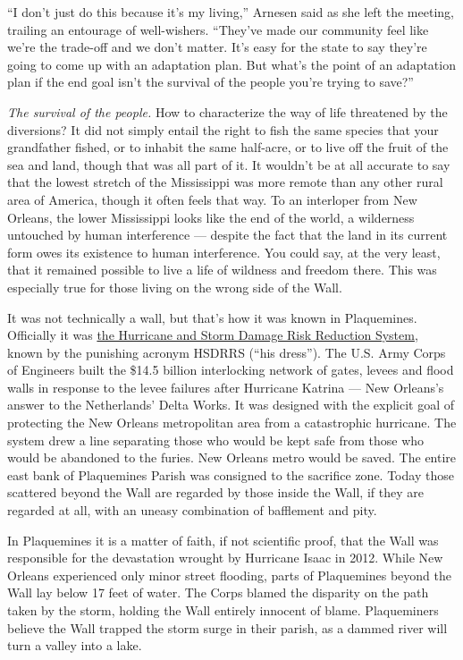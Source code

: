 ``I don't just do this because it's my living,'' Arnesen said as she
left the meeting, trailing an entourage of well-wishers. ``They've made
our community feel like we're the trade-off and we don't matter. It's
easy for the state to say they're going to come up with an adaptation
plan. But what's the point of an adaptation plan if the end goal isn't
the survival of the people you're trying to save?''

\emph{The survival of the people.} How to characterize the way of life
threatened by the diversions? It did not simply entail the right to fish
the same species that your grandfather fished, or to inhabit the same
half-acre, or to live off the fruit of the sea and land, though that was
all part of it. It wouldn't be at all accurate to say that the lowest
stretch of the Mississippi was more remote than any other rural area of
America, though it often feels that way. To an interloper from New
Orleans, the lower Mississippi looks like the end of the world, a
wilderness untouched by human interference --- despite the fact that the
land in its current form owes its existence to human interference. You
could say, at the very least, that it remained possible to live a life
of wildness and freedom there. This was especially true for those living
on the wrong side of the Wall.

It was not technically a wall, but that's how it was known in
Plaquemines. Officially it was
\href{https://www.mvn.usace.army.mil/Missions/Mississippi-River-Flood-Control/Bonnet-Carre-Spillway-Overview/}{the
Hurricane and Storm Damage Risk Reduction System}, known by the
punishing acronym HSDRRS (``his dress''). The U.S. Army Corps of
Engineers built the \$14.5 billion interlocking network of gates, levees
and flood walls in response to the levee failures after Hurricane
Katrina --- New Orleans's answer to the Netherlands' Delta Works. It was
designed with the explicit goal of protecting the New Orleans
metropolitan area from a catastrophic hurricane. The system drew a line
separating those who would be kept safe from those who would be
abandoned to the furies. New Orleans metro would be saved. The entire
east bank of Plaquemines Parish was consigned to the sacrifice zone.
Today those scattered beyond the Wall are regarded by those inside the
Wall, if they are regarded at all, with an uneasy combination of
bafflement and pity.

In Plaquemines it is a matter of faith, if not scientific proof, that
the Wall was responsible for the devastation wrought by Hurricane Isaac
in 2012. While New Orleans experienced only minor street flooding, parts
of Plaquemines beyond the Wall lay below 17 feet of water. The Corps
blamed the disparity on the path taken by the storm, holding the Wall
entirely innocent of blame. Plaqueminers believe the Wall trapped the
storm surge in their parish, as a dammed river will turn a valley into a
lake.

